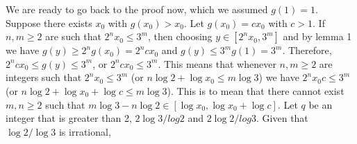 \documentclass[11pt,a4paper]{article}
\newcommand{\<}{\langle}
\renewcommand{\>}{\rangle}
\begin{document}
\begin{enumerate}
    We are ready to go back to the proof now, which we assumed $g(1)=1$. Suppose there exists $x_0$ with $g(x_0)>x_0$. Let $g(x_0)=cx_0$ with $c>1$. If $n, m\ge 2$ are such that $2^nx_0\le 3^m$, then choosing $y\in [2^nx_0, 3^m]$ and by lemma 1 we have $g(y)\ge 2^ng(x_0)=2^ncx_0$ and $g(y)\le 3^mg(1)=3^m$. Therefore, $2^ncx_0\le g(y)\le 3^m$, or $2^ncx_0\le 3^m$. This means that whenever $n, m\ge 2$ are integers such that $2^nx_0\le 3^m$ (or $n\log 2 + \log x_0\le m\log 3$) we have $2^nx_0c\le 3^m$ (or $n\log 2 + \log x_0 + \log c \le m\log 3$). This is to mean that there cannot exist $m, n\ge 2$ such that $m\log 3 - n\log 2\in [\log x_0, \log x_0 + \log c]$. 
    Let $q$ be an integer that is greater than 2, $2\log 3/log 2$ and $2\log 2/log 3$. Given that $\log 2/\log 3$ is irrational, 
		
\end{enumerate}
\end{document}
